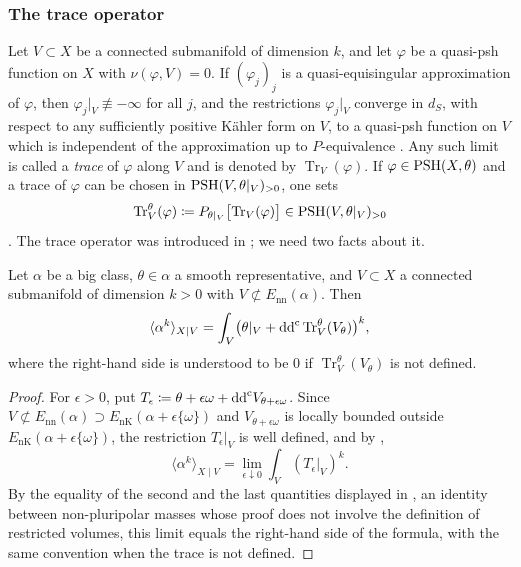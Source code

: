 \documentclass[11pt,a4paper]{amsart}
\newcommand{\EnK}{E_{\mathrm{nK}}}
\newcommand{\Enn}{E_{\mathrm{nn}}}
\newcommand{\trc}{\operatorname{Tr}}            %
\newcommand{\dS}{d_{S}}                          %
\theoremstyle{definition}
\begin{document}
\subsubsection*{The trace operator}
Let $V\subset X$ be a connected submanifold of dimension $k$, and let
$\varphi$ be a quasi-psh function on $X$ with $\nu(\varphi,V)=0$. If
$(\varphi_j)_j$ is a quasi-equisingular approximation of $\varphi$, then
$\varphi_j|_V\not\equiv-\infty$ for all $j$, and the restrictions
$\varphi_j|_V$ converge in $\dS$, with respect to any sufficiently
positive K\"ahler form on $V$, to a quasi-psh function on $V$ which is
independent of the approximation up to $P$-equivalence
\cite[Propositions~8.1.1 and~8.1.2, Definition~8.1.1]{XiaSGPT}. Any such
limit is called a \emph{trace} of $\varphi$ along $V$ and is denoted by
$\trc_V(\varphi)$. If $\varphi\in\mathrm{PSH}(X,\theta)$ and a trace of
$\varphi$ can be chosen in $\mathrm{PSH}(V,\theta|_V)_{>0}$, one sets
\[
  \trc^\theta_V(\varphi)\coloneqq P_{\theta|_V}\bigl[\trc_V(\varphi)\bigr]
  \in\PSH(V,\theta|_V)_{>0}
\]
\cite[Definition~8.1.2]{XiaSGPT}. The trace operator was introduced in
\cite{DX24}; we need two facts about it.

\begin{theorem}\label{thm:trace-formula}
Let $\alpha$ be a big class, $\theta\in\alpha$ a smooth representative,
and $V\subset X$ a connected submanifold of dimension $k>0$ with
$V\not\subset\Enn(\alpha)$. Then
\[
  \langle\alpha^k\rangle_{X\mid V}
  =\int_V\bigl(\theta|_V+\ddc\trc^\theta_V(V_\theta)\bigr)^k,
\]
where the right-hand side is understood to be $0$ if
$\trc^\theta_V(V_\theta)$ is not defined.
\end{theorem}

\begin{proof}
For $\epsilon>0$, put
$T_\epsilon\coloneqq \theta+\epsilon\omega+\mathrm{dd}^{\mathrm{c}} V_{\theta+\epsilon\omega}$.
Since $V\not\subset\Enn(\alpha)\supset\EnK(\alpha+\epsilon\{\omega\})$
and $V_{\theta+\epsilon\omega}$ is locally bounded outside
$\EnK(\alpha+\epsilon\{\omega\})$, the restriction $T_\epsilon|_V$ is well
defined, and by \cite[Remark~2.2 and equation~(2.3)]{CT22},
\[
  \langle\alpha^k\rangle_{X\mid V}
  =\lim_{\epsilon\downarrow0}\int_V(T_\epsilon|_V)^k .
\]
By the equality of the second and the last quantities displayed in
\cite[Theorem~8.3.1]{XiaSGPT}, an identity between non-pluripolar masses
whose proof does not involve the definition of restricted volumes, this
limit equals the right-hand side of the formula, with the same convention
when the trace is not defined.
\end{proof}
\end{document}
